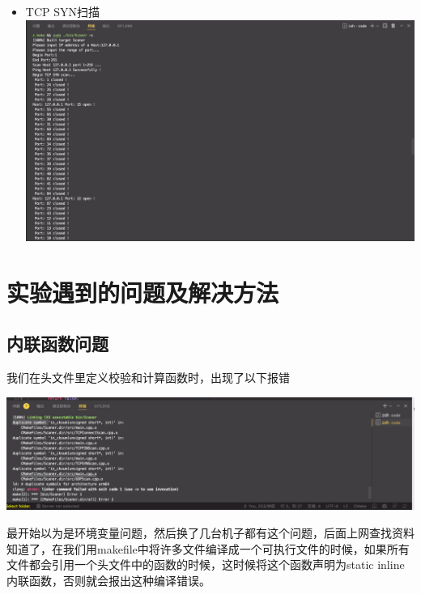 \documentclass[UTF8,a4paper,10pt]{ctexart}
\begin{document}
\begin{itemize}
    \item TCP SYN扫描\\ 
    \includegraphics[scale = 0.25]{img/11.png}
\end{itemize}

\section{实验遇到的问题及解决方法}
\subsection{内联函数问题}
我们在头文件里定义校验和计算函数时，出现了以下报错
\begin{center}
    \includegraphics[scale = 0.55]{img/报错1}
\end{center}
最开始以为是环境变量问题，然后换了几台机子都有这个问题，后面上网查找资料知道了，在我们用makefile中将许多文件编译成一个可执行文件的时候，如果所有文件都会引用一个头文件中的函数的时候，这时候将这个函数声明为static inline内联函数，否则就会报出这种编译错误。
\end{document}
